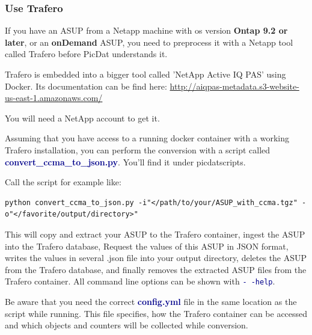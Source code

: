 \documentclass[8pt]{beamer}
\begin{document}
\begin{frame}[fragile, label=trafero]
\frametitle{Use Trafero}
If you have an ASUP from a Netapp machine with os version \textbf{Ontap 9.2 or later}, or an \textbf{onDemand} ASUP, you need to preprocess it with a Netapp tool called Trafero before PicDat understands it.

Trafero is embedded into a bigger tool called 'NetApp Active IQ PAS' using Docker. Its documentation can be find here: \url{http://aiqpas-metadata.s3-website-us-east-1.amazonaws.com/}

You will need a NetApp account to get it.
\bigskip

Assuming that you have access to a running docker container with a working Trafero installation, you can perform the conversion with a script called \textcolor{darkblue}{\textbf{convert\_ccma\_to\_json.py}}. You'll find it under picdatscripts.
\bigskip

Call the script for example like:

\begin{lstlisting}
python convert_ccma_to_json.py -i"</path/to/your/ASUP_with_ccma.tgz" -o"</favorite/output/directory>"
\end{lstlisting}

This will copy and extract your ASUP to the Trafero container, ingest the ASUP into the Trafero database, Request the values of this ASUP in JSON format, writes the values in several .json file into your output directory, deletes the ASUP from the Trafero database, and finally removes the extracted ASUP files from the Trafero container. All command line options can be shown with \textcolor{darkblue}{\texttt{-\,-help}}.
\bigskip

Be aware that you need the correct \textcolor{darkblue}{\textbf{config.yml}} file in the same location as the script while running. This file specifies, how the Trafero container can be accessed and which objects and counters will be collected while conversion. 
\end{frame}
\end{document}
